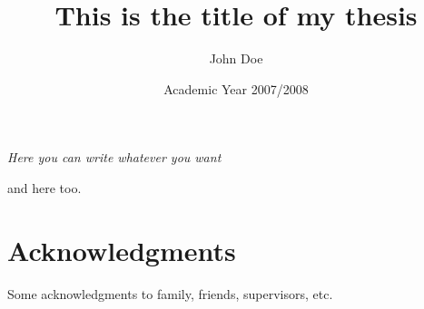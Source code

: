 \documentclass[a4paper,english,twoside,openright,11pt]{book}
\title{This is the title of my thesis}
\author{John Doe}
\date{Academic Year 2007/2008}
\begin{document}


\thispagestyle{empty}
\mbox{}
\newpage

%
\begin{flushright}
\thispagestyle{empty}
\null{}
{\it Here you can write whatever you want

\vspace{10pt}
and here too.
}
\null
\end{flushright}
%
\thispagestyle{empty}
\mbox{}
\newpage
%
\chapter*{Acknowledgments}

Some acknowledgments to family, friends, supervisors, etc.

\thispagestyle{empty}
\mbox{}
\newpage

\tableofcontents
\listoffigures
\listoftables


\mainmatter









\label{Bibliography}


\end{document}
